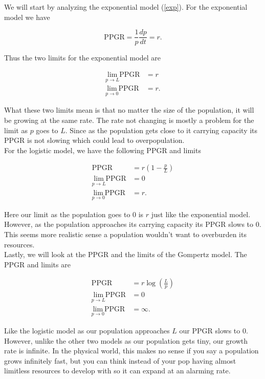 \documentclass[english]{article}
\newcommand{\pop}{population }
\begin{document}
We will start by analyzing the exponential model (\ref{exp}). For the exponential model we have

\begin{equation*}
\text{PPGR}=\frac{1}{p}\frac{dp}{dt}=r.
\end{equation*}

Thus the two limits for the exponential model are

\begin{align*}
\lim_{p\rightarrow L}\text{PPGR}&=r\\
\lim_{p\rightarrow 0}\text{PPGR}&=r.
\end{align*}

What these two limits mean is that no matter the size of the population, it will be growing at the same rate. The rate not changing is mostly a problem for the limit as $ p $ goes to $ L $. Since as the \pop gets close to it carrying capacity its PPGR is not slowing which could lead to overpopulation.\\ 

For the logistic model, we have the following PPGR and limits

\begin{align*}
\text{PPGR}&=r(1-\frac{p}{L})\\
\lim_{p\rightarrow L}\text{PPGR}&=0\\
\lim_{p\rightarrow 0}\text{PPGR}&=r.
\end{align*}

Here our limit as the population goes to 0 is $ r $ just like the exponential model. However, as the population approaches its carrying capacity its PPGR slows to 0. This seems more realistic sense a \pop wouldn't want to overburden its resources.\\

Lastly, we will look at the PPGR and the limits of the Gompertz model. The PPGR and limits are

\begin{align*}
\text{PPGR}&=r\log\left(\frac{L}{p}\right)\\
\lim_{p\rightarrow L}\text{PPGR}&=0\\
\lim_{p\rightarrow 0}\text{PPGR}&=\infty.
\end{align*}

Like the logistic model as our \pop approaches $ L $ our PPGR slows to 0. However, unlike the other two models as our \pop gets tiny, our growth rate is infinite. In the physical world, this makes no sense if you say a population grows infinitely fast, but you can think instead of your pop having almost limitless resources to develop with so it can expand at an alarming rate.\\
\end{document}
